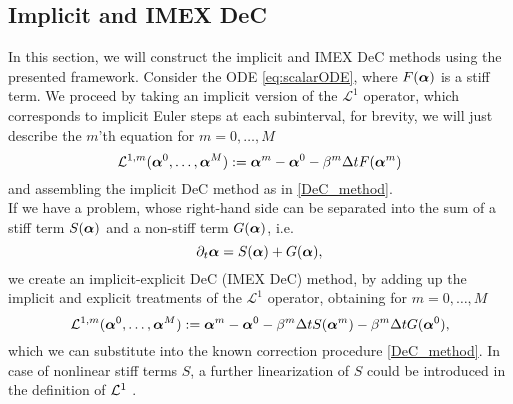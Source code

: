 \subsection{Implicit and IMEX DeC}
In this section, we will construct the implicit and IMEX DeC methods using the presented framework. Consider the ODE \eqref{eq:scalarODE}, where $F(\boldsymbol{\alpha})$ is a stiff term. 
We proceed by taking an implicit version of the $\mathcal{L}^1$ operator, which corresponds to implicit Euler steps at each subinterval, for brevity, we will just describe the $m$'th equation for $m=0,\dots,M$
\begin{equation}\label{eq:ImL1}
\mathcal{L}^{1,m}(\boldsymbol{\alpha}^0, \dots, \boldsymbol{\alpha}^M) :=
\boldsymbol{\alpha}^m-\boldsymbol{\alpha}^0 - \beta^m \Delta t F(\boldsymbol{\alpha}^m)
\end{equation}
and assembling the implicit DeC method as in \eqref{DeC_method}.\\
If we have a problem, whose right-hand side can be separated into the sum of a stiff term $S(\boldsymbol{\alpha})$ and a non-stiff term $G(\boldsymbol{\alpha})$, i.e.
\begin{equation}\label{eq:IMEXODE}
\partial_t\boldsymbol{\alpha}=S(\boldsymbol{\alpha})+G(\boldsymbol{\alpha}),
\end{equation} 
we create an implicit-explicit DeC (IMEX DeC) method, by adding up the implicit and explicit treatments of the $\mathcal{L}^1$ operator, obtaining for $m=0,\dots,M$
\begin{equation}
\mathcal{L}^{1,m}(\boldsymbol{\alpha}^0, \dots, \boldsymbol{\alpha}^M) :=
\boldsymbol{\alpha}^m-\boldsymbol{\alpha}^0 - \beta^m \Delta t S(\boldsymbol{\alpha}^m)- \beta^m \Delta t G(\boldsymbol{\alpha}^0),
\end{equation}
which we can substitute into the known correction procedure \eqref{DeC_method}.
In case of nonlinear stiff terms $S$, a further linearization of $S$ could be introduced in the definition of $\mathcal L^1$ \cite{Han_Veiga_2021}.

